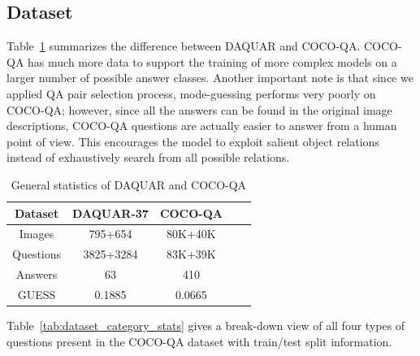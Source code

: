 \documentclass{article}
\renewcommand{\#}[1]{\textbf{#1}}
\begin{document}
\subsection{Dataset}
Table~\ref{tab:dataset_stats} summarizes the difference between DAQUAR and COCO-QA. COCO-QA has much more data to support the training of more complex models on a larger number of possible answer classes. Another important note is that since we applied QA pair selection process, mode-guessing performs very poorly on COCO-QA; however, since all the answers can be found in the original image descriptions, COCO-QA questions are actually easier to answer from a human point of view. This encourages the model to exploit salient object relations instead of exhaustively search from all possible relations.

\begin{table}[h]
\label{tab:dataset_stats}
\caption{General statistics of DAQUAR and COCO-QA}
\vskip 0.15in
\begin{center}
\begin{small}
\begin{sc}
\begin{tabular}{c c c c c}
\hline
\abovespace\belowspace
Dataset        & DAQUAR-37 & COCO-QA \\
\hline
\abovespace
Images         & 795+654   & 80K+40K \\
Questions      & 3825+3284 & 83K+39K \\
Answers        & 63        & 410     \\
\belowspace
GUESS          & 0.1885    & 0.0665  \\
\hline
\end{tabular}
\end{sc}
\end{small}
\end{center}
\end{table}

Table~\ref{tab:dataset_category_stats} gives a break-down view of all four types of questions present in the COCO-QA dataset with train/test split information.
\end{document}
